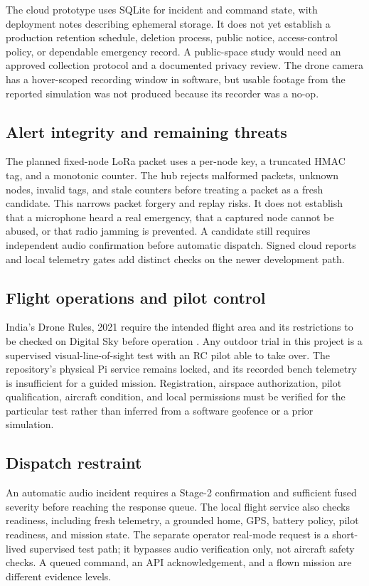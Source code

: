 \documentclass[12pt,a4paper]{report}
\begin{document}
The cloud prototype uses SQLite for incident and command state, with
deployment notes describing ephemeral storage. It does not yet
establish a production retention schedule, deletion process, public
notice, access-control policy, or dependable emergency record. A
public-space study would need an approved collection protocol and a
documented privacy review. The drone camera has a hover-scoped
recording window in software, but usable footage from the reported
simulation was not produced because its recorder was a no-op.

\subsection{Alert integrity and remaining threats}
\label{sec:integrity}
The planned fixed-node LoRa packet uses a per-node key, a truncated
HMAC tag, and a monotonic counter. The hub rejects malformed packets,
unknown nodes, invalid tags, and stale counters before treating a
packet as a fresh candidate. This narrows packet forgery and replay
risks. It does not establish that a microphone heard a real emergency,
that a captured node cannot be abused, or that radio jamming is
prevented. A candidate still requires independent audio confirmation
before automatic dispatch. Signed cloud reports and local telemetry
gates add distinct checks on the newer development path.

\subsection{Flight operations and pilot control}
\label{sec:flightlaw}
India's Drone Rules, 2021 require the intended flight area and its
restrictions to be checked on Digital Sky before operation
\cite{dronerules}. Any outdoor trial in this project is a supervised
visual-line-of-sight test with an RC pilot able to take over. The
repository's physical Pi service remains locked, and its recorded
bench telemetry is insufficient for a guided mission. Registration,
airspace authorization, pilot qualification, aircraft condition, and
local permissions must be verified for the particular test rather
than inferred from a software geofence or a prior simulation.

\subsection{Dispatch restraint}
\label{sec:restraint}
An automatic audio incident requires a Stage-2 confirmation and
sufficient fused severity before reaching the response queue.
The local flight service also checks readiness, including fresh
telemetry, a grounded home, GPS, battery policy, pilot readiness, and
mission state. The separate operator real-mode request is a
short-lived supervised test path; it bypasses audio verification
only, not aircraft safety checks. A queued command, an API
acknowledgement, and a flown mission are different evidence levels.
\end{document}
